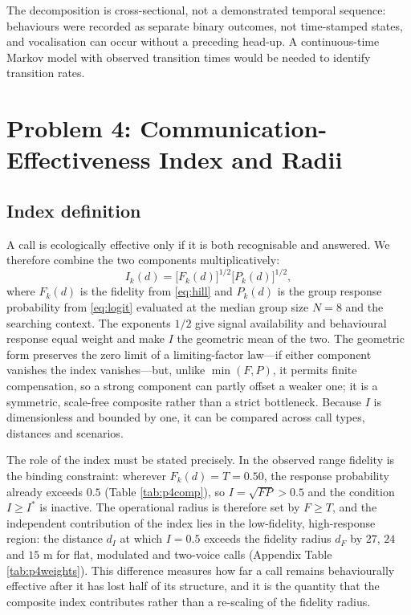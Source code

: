 \documentclass{apmcmthesis}
\begin{document}
The decomposition is cross-sectional, not a demonstrated temporal sequence: behaviours were recorded as separate binary outcomes, not time-stamped states, and vocalisation can occur without a preceding head-up. A continuous-time Markov model with observed transition times would be needed to identify transition rates.

\section{Problem 4: Communication-Effectiveness Index and Radii}

\subsection{Index definition}

A call is ecologically effective only if it is both recognisable and answered. We therefore combine the two components multiplicatively:
\begin{equation}
I_k(d)=\bigl[F_k(d)\bigr]^{1/2}\bigl[P_k(d)\bigr]^{1/2},
\label{eq:index}
\end{equation}
where $F_k(d)$ is the fidelity from \eqref{eq:hill} and $P_k(d)$ is the group response probability from \eqref{eq:logit} evaluated at the median group size $N=8$ and the searching context. The exponents $1/2$ give signal availability and behavioural response equal weight and make $I$ the geometric mean of the two. The geometric form preserves the zero limit of a limiting-factor law---if either component vanishes the index vanishes---but, unlike $\min(F,P)$, it permits finite compensation, so a strong component can partly offset a weaker one; it is a symmetric, scale-free composite rather than a strict bottleneck. Because $I$ is dimensionless and bounded by one, it can be compared across call types, distances and scenarios.

The role of the index must be stated precisely. In the observed range fidelity is the binding constraint: wherever $F_k(d)=T=0.50$, the response probability already exceeds $0.5$ (Table \ref{tab:p4comp}), so $I=\sqrt{FP}>0.5$ and the condition $I\ge I^{\ast}$ is inactive. The operational radius is therefore set by $F\ge T$, and the independent contribution of the index lies in the low-fidelity, high-response region: the distance $d_I$ at which $I=0.5$ exceeds the fidelity radius $d_F$ by $27$, $24$ and $15$ m for flat, modulated and two-voice calls (Appendix Table \ref{tab:p4weights}). This difference measures how far a call remains behaviourally effective after it has lost half of its structure, and it is the quantity that the composite index contributes rather than a re-scaling of the fidelity radius.
\end{document}
